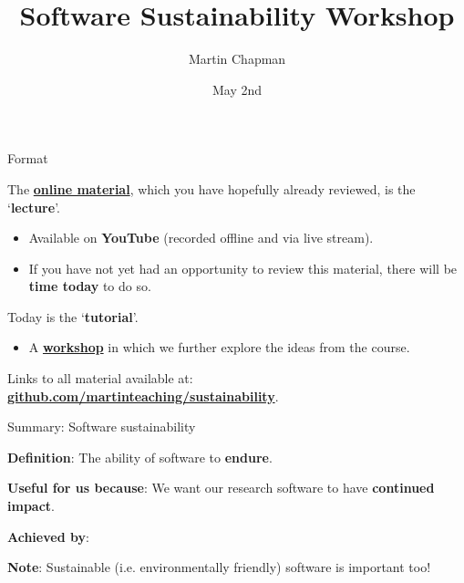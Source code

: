 \documentclass[10pt, dvipsnames, table, aspectratio=169]{beamer}
\title{Software Sustainability Workshop}
\subtitle{}
\date{May 2nd}
\author{Martin Chapman}
\institute{King's College London}
\begin{document}



\begin{frame}[fragile]{Format}

    The \href{https://github.com/martinteaching/sustainability#material}{\textbf{online material}}, which you have hopefully already reviewed, is the `\textbf{lecture}'.
    
    \begin{itemize}
    
        \item Available on \textbf{YouTube} (recorded offline and via live stream).
    
        \item If you have not yet had an opportunity to review this material, there will be \textbf{time today} to do so.
    
    \end{itemize}
    
    Today is the `\textbf{tutorial}'.
    
    \begin{itemize}
    
        \item A \href{https://github.com/martinteaching/sustainability/tree/master/workshops/kcl/2025}{\textbf{workshop}} in which we further explore the ideas from the course.
    
    \end{itemize}
    
    Links to all material available at:
    \href{https://github.com/martinteaching/sustainability}{\textbf{github.com/martinteaching/sustainability}}.
    
\end{frame}


\begin{frame}[fragile]{Summary: Software sustainability}

\textbf{Definition}: The ability of software to \textbf{endure}.

\textbf{Useful for us because}: We want our research software to have \textbf{continued impact}.

\textbf{Achieved by}:

\begin{center}
    
\end{center}

\textbf{Note}: Sustainable (i.e. environmentally friendly) software is important too!

\end{frame}
\end{document}
